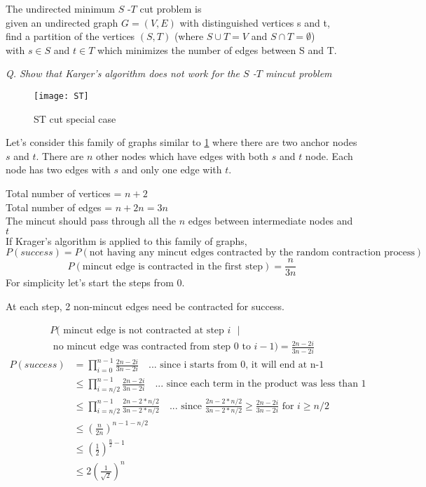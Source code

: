 \documentclass{homeworg}
\begin{document}
\begin{python}
\end{python}

\newpage
\exercise
The undirected minimum $S$ -$T$ cut problem is \\
given an undirected graph $G =(V,E)$ with distinguished vertices s and t, \\
find a partition of the vertices $(S,T)$ (where $S \cup T = V$ and $S \cap T = \emptyset$) \\
with $s \in S$ and $t \in T$ which minimizes the number of edges between S and T.

\emph{Q. Show that Karger’s algorithm does not work for the $S$ -$T$ mincut problem }

\begin{figure}[h]
    \centering
    \texttt{[image: ST]}
    \caption{ST cut special case}
    \label{fig:ST}
\end{figure}

Let's consider this family of graphs similar to \ref{fig:ST} where there are two anchor nodes $s$ and $t$. There are $n$ other nodes which have edges with both $s$ and $t$ node. Each node has two edges with $s$ and only one edge with $t$.

Total number of vertices = $n+2$\\
Total number of edges = $n + 2n = 3n$\\
The mincut should pass through all the $n$ edges between intermediate nodes and $t$\\
If Krager's algorithm is applied to this family of graphs, \\
\[
P(success) = P(\text{not having any mincut edges contracted by the random contraction process}) 
\]
\[
P (\text{mincut edge is contracted in the first step}) = \frac{n}{3n}
\]
For simplicity let's start the steps from 0.

At each step,  2 non-mincut edges need be contracted for success.

\begin{multline*}
P (\text{ mincut edge is not contracted at step $i$ } |\\
\text{ no mincut edge was contracted from step $0$ to $i-1$} ) = \frac{2n-2i}{3n-2i}
\end{multline*}
\begin{align*}
    P(success) &= \prod_{i=0}^{n-1} \frac{2n-2i}{3n-2i} \quad \text{... since i starts from 0, it will end at n-1}\\
    & \leq \prod_{i=n/2}^{n-1} \frac{2n-2i}{3n-2i} \quad \text{... since each term in the product was less than 1}\\
    & \leq \prod_{i=n/2}^{n-1} \frac{2n-2\ast n/2}{3n-2\ast n/2} \quad \text{... since } \frac{2n-2\ast n/2}{3n-2\ast n/2} \geq \frac{2n-2i}{3n-2i} \text{ for } i \geq n/2\\
    & \leq \left(\frac{n}{2n}\right)^{n-1-n/2}\\
    & \leq \left(\frac{1}{2}\right)^{\frac{n}{2}-1}\\
    & \leq 2 \left(\frac{1}{\surd{2}}\right)^n
\end{align*}
\end{document}
